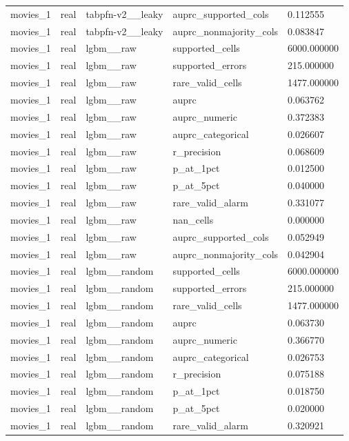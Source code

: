 \begin{tabular}{lllll}
movies\_1 & real & tabpfn-v2\_\_leaky & auprc\_supported\_cols & 0.112555 \\
movies\_1 & real & tabpfn-v2\_\_leaky & auprc\_nonmajority\_cols & 0.083847 \\
movies\_1 & real & lgbm\_\_raw & supported\_cells & 6000.000000 \\
movies\_1 & real & lgbm\_\_raw & supported\_errors & 215.000000 \\
movies\_1 & real & lgbm\_\_raw & rare\_valid\_cells & 1477.000000 \\
movies\_1 & real & lgbm\_\_raw & auprc & 0.063762 \\
movies\_1 & real & lgbm\_\_raw & auprc\_numeric & 0.372383 \\
movies\_1 & real & lgbm\_\_raw & auprc\_categorical & 0.026607 \\
movies\_1 & real & lgbm\_\_raw & r\_precision & 0.068609 \\
movies\_1 & real & lgbm\_\_raw & p\_at\_1pct & 0.012500 \\
movies\_1 & real & lgbm\_\_raw & p\_at\_5pct & 0.040000 \\
movies\_1 & real & lgbm\_\_raw & rare\_valid\_alarm & 0.331077 \\
movies\_1 & real & lgbm\_\_raw & nan\_cells & 0.000000 \\
movies\_1 & real & lgbm\_\_raw & auprc\_supported\_cols & 0.052949 \\
movies\_1 & real & lgbm\_\_raw & auprc\_nonmajority\_cols & 0.042904 \\
movies\_1 & real & lgbm\_\_random & supported\_cells & 6000.000000 \\
movies\_1 & real & lgbm\_\_random & supported\_errors & 215.000000 \\
movies\_1 & real & lgbm\_\_random & rare\_valid\_cells & 1477.000000 \\
movies\_1 & real & lgbm\_\_random & auprc & 0.063730 \\
movies\_1 & real & lgbm\_\_random & auprc\_numeric & 0.366770 \\
movies\_1 & real & lgbm\_\_random & auprc\_categorical & 0.026753 \\
movies\_1 & real & lgbm\_\_random & r\_precision & 0.075188 \\
movies\_1 & real & lgbm\_\_random & p\_at\_1pct & 0.018750 \\
movies\_1 & real & lgbm\_\_random & p\_at\_5pct & 0.020000 \\
movies\_1 & real & lgbm\_\_random & rare\_valid\_alarm & 0.320921 \\

\end{tabular}
